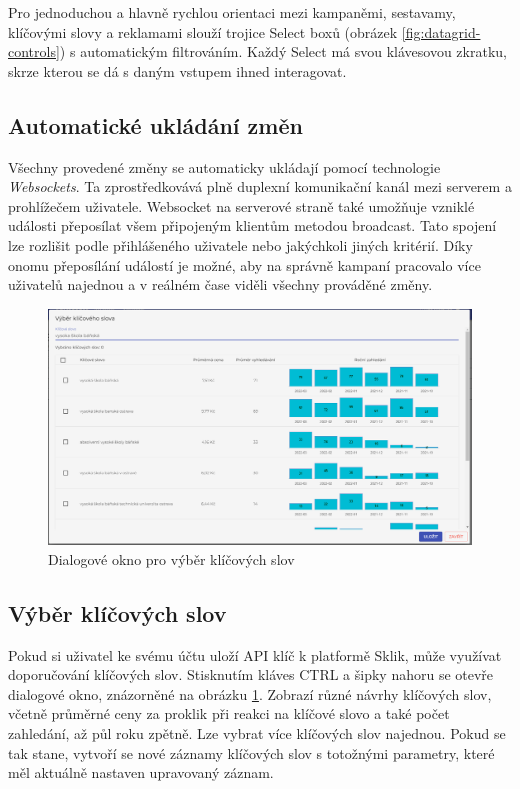 Pro jednoduchou a hlavně rychlou orientaci mezi kampaněmi, sestavamy, klíčovými slovy a reklamami slouží trojice Select boxů (obrázek \ref{fig:datagrid-controls}) s automatickým filtrováním.
Každý Select má svou klávesovou zkratku, skrze kterou se dá s daným vstupem ihned interagovat. 



\subsection{Automatické ukládání změn}
Všechny provedené změny se automaticky ukládají pomocí technologie \emph{Websockets}. Ta zprostředkovává plně duplexní komunikační kanál mezi serverem a prohlížečem uživatele.
Websocket na serverové straně také umožňuje vzniklé události přeposílat všem připojeným klientům metodou broadcast. Tato spojení lze rozlišit podle přihlášeného uživatele nebo jakýchkoli jiných
kritérií. Díky onomu přeposílání událostí je možné, aby na správně kampaní pracovalo více uživatelů najednou a v reálném čase viděli všechny prováděné změny.

\begin{figure}[h]
    \centering
    \includegraphics[width=1\textwidth]{Figures/ui/keyword-dialog.png}
    \caption{Dialogové okno pro výběr klíčových slov}
    \label{fig:keyword-dialog}
\end{figure}

\subsection{Výběr klíčových slov}
Pokud si uživatel ke svému účtu uloží API klíč k platformě Sklik, může využívat doporučování klíčových slov. Stisknutím kláves CTRL a šipky nahoru se otevře dialogové okno,
znázorněné na obrázku \ref{fig:keyword-dialog}. Zobrazí různé návrhy klíčových slov, včetně průměrné ceny za proklik při reakci na klíčové slovo a také počet zahledání, až půl roku zpětně.
Lze vybrat více klíčových slov najednou. Pokud se tak stane, vytvoří se nové záznamy klíčových slov s totožnými parametry, které měl aktuálně nastaven upravovaný záznam.  



